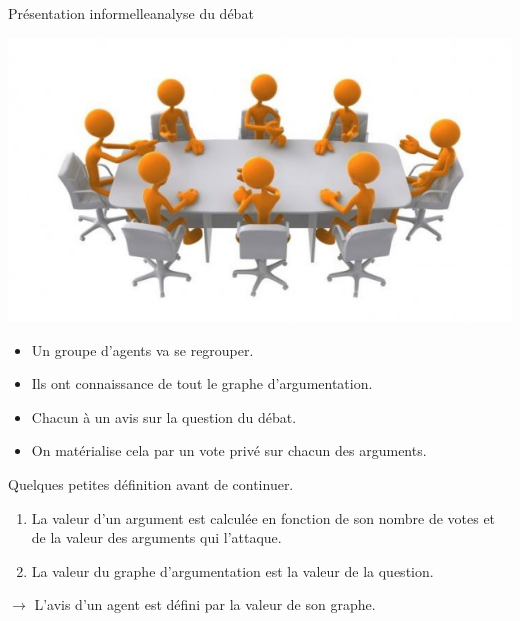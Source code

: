 \documentclass{beamer}
\begin{document}
  \begin{frame}{Présentation informelle}{analyse du débat}
    \begin{center}
      \includegraphics[scale=0.3]{../docs/images_presentation/Clipart-Meeting.jpg}
    \end{center}

    \begin{overprint}
      \begin{itemize}
        \item Un groupe d'agents va se regrouper.
        \item Ils ont connaissance de tout le graphe d'argumentation.
        \item Chacun à un avis sur la question du débat.
        \item On matérialise cela par un vote privé sur chacun des arguments.
      \end{itemize}
      Quelques petites définition avant de continuer.
      \begin{enumerate}
        \item La valeur d'un argument est calculée en fonction de son nombre de votes et de la valeur des arguments qui l'attaque.
        \item La valeur du graphe d'argumentation est la valeur de la question.
      \end{enumerate}

      $\rightarrow$ L'avis d'un agent est défini par la valeur de son graphe.
    \end{overprint}
  \end{frame}
\end{document}

